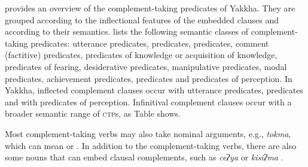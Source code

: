  provides an overview of the complement-taking predicates of Yakkha. They are grouped according to the  inflectional features of the embedded clauses and according to their semantics.  \citet[120]{Noonan2007Complementation} lists the following semantic classes of complement-taking predicates: utterance predicates,  predicates,  predicates, comment (factitive) predicates, predicates of knowledge or acquisition of knowledge, predicates of fearing, desiderative  predicates, manipulative predicates, modal predicates, achievement predicates,  predicates and predicates of perception. In Yakkha, inflected complement clauses occur with utterance predicates,  predicates and  with predicates of perception. Infinitival  complement clauses occur with a broader semantic range of \textsc{ctp}s, as Table  shows. 

Most complement-taking verbs may also take nominal arguments, e.g., \emph{tokma}, which can mean  or . In addition to the complement-taking verbs, there are also some nouns that can embed clausal complements, such as \emph{ceʔya}  or \emph{kisiʔma} . 


